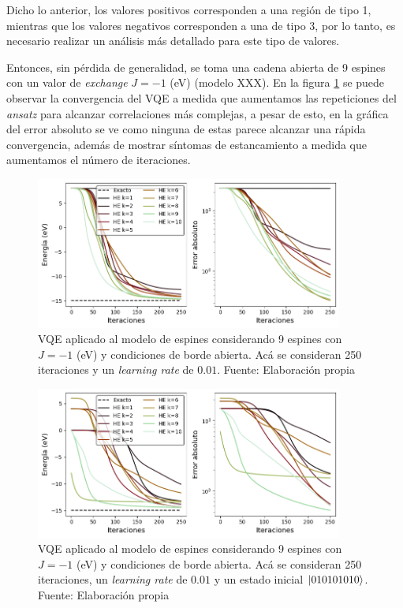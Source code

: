 Dicho lo anterior, los valores positivos corresponden a una región de tipo 1, mientras que los valores negativos corresponden a una de tipo 3, por lo tanto, es necesario realizar un análisis más detallado para este tipo de valores.

Entonces, sin pérdida de generalidad, se toma una cadena abierta de 9 espines con un valor de \textit{exchange} $J=-1$ (eV) (modelo XXX). En la figura \ref{fig:8} se puede observar la convergencia del VQE a medida que aumentamos las repeticiones del \textit{ansatz} para alcanzar correlaciones más complejas, a pesar de esto, en la gráfica del error absoluto se ve como ninguna de estas parece alcanzar una rápida convergencia, además de mostrar síntomas de estancamiento a medida que aumentamos el número de iteraciones.

\begin{figure}[H]
\centering
\includegraphics[width=0.9\textwidth]{figures/S4/spins/barridoespines2.png}
\caption{\label{fig:8} VQE aplicado al modelo de espines considerando 9 espines con $J=-1$ (eV) y condiciones de borde abierta. Acá se consideran 250 iteraciones y un \textit{learning rate} de $0.01$. Fuente: Elaboración propia}
\end{figure}

\begin{figure}[H]
\centering
\includegraphics[width=0.9\textwidth]{figures/S4/spins/barridoespines3.png}
\caption{\label{fig:9} VQE aplicado al modelo de espines considerando 9 espines con $J=-1$ (eV) y condiciones de borde abierta. Acá se consideran 250 iteraciones, un \textit{learning rate} de $0.01$ y un estado inicial $\ket{010101010}$. Fuente: Elaboración propia}
\end{figure}


